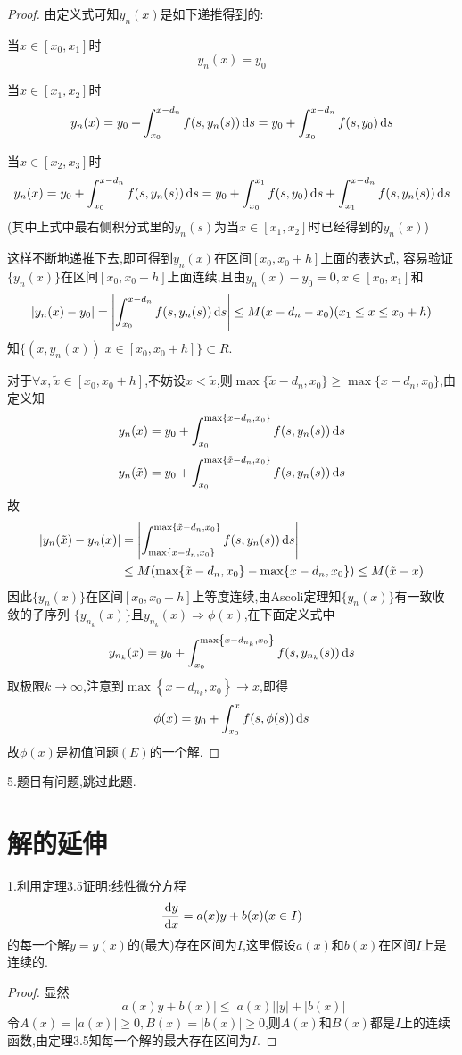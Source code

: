 \begin{proof}
由定义式可知$y_n(x)$是如下递推得到的:

当$x\in[x_0,x_1]$时
\[y_n(x)=y_0\]

当$x\in[x_1,x_2]$时
\[y_n(x)=y_0+\int_{x_0}^{x-d_n}f(s,y_n(s))\,\mathrm{d} s=y_0+\int_{x_0}^{x-d_n}f(s,y_0)\,\mathrm{d} s\]

当$x\in[x_2,x_3]$时
\[y_n(x)=y_0+\int_{x_0}^{x-d_n}f(s,y_n(s))\,\mathrm{d} s=y_0+\int_{x_0}^{x_1}f(s,y_0)\,\mathrm{d} s+\int_{x_1}^{x-d_n}f(s,y_n(s))\,\mathrm{d} s\]
(其中上式中最右侧积分式里的$y_n(s)$为当$x\in[x_1,x_2]$时已经得到的$y_n(x)$)

这样不断地递推下去,即可得到$y_n(x)$在区间$[x_0,x_0+h]$上面的表达式,
容易验证$\{y_n(x)\}$在区间$[x_0,x_0+h]$上面连续,且由$y_n(x)-y_0=0,x\in[x_0,x_1]$和
\[|y_n(x)-y_0|=\left|\int_{x_0}^{x-d_n}f(s,y_n(s))\,\mathrm{d} s\right|\leq M(x-d_n-x_0)(x_1\leq x\leq x_0+h)\]
知$\{(x,y_n(x))|x\in[x_0,x_0+h]\}\subset R$.

对于$\forall x,\tilde{x}\in[x_0,x_0+h]$,不妨设$x<\tilde{x}$,则$\max\{\tilde{x}-d_n,x_0\}\geq\max\{x-d_n,x_0\}$,由定义知
\[y_n(x)=y_0+\int_{x_0}^{\max\{x-d_n,x_0\}}f(s,y_n(s))\,\mathrm{d} s\]
\[y_n(\tilde{x})=y_0+\int_{x_0}^{\max\{\tilde{x}-d_n,x_0\}}f(s,y_n(s))\,\mathrm{d} s\]
故
\[\begin{split}|y_n(\tilde{x})-y_n(x)|&=\left|\int_{\max\{x-d_n,x_0\}}^{\max\{\tilde{x}-d_n,x_0\}}f(s,y_n(s))\,\mathrm{d} s\right|\\
&\leq M(\max\{\tilde{x}-d_n,x_0\}-\max\{x-d_n,x_0\})\leq M(\tilde{x}-x)
\end{split}\]
因此$\{y_n(x)\}$在区间$[x_0,x_0+h]$上等度连续,由Ascoli定理知$\{y_n(x)\}$有一致收敛的子序列
$\{y_{n_k}(x)\}$且$y_{n_k}(x)\Rightarrow\phi(x)$,在下面定义式中
\[y_{n_k}(x)=y_0+\int_{x_0}^{\max\left\{x-d_{n_k},x_0\right\}}f(s,y_{n_k}(s))\,\mathrm{d} s\]
取极限$k\to\infty$,注意到$\max\left\{x-d_{n_k},x_0\right\}\to x$,即得
\[\phi(x)=y_0+\int_{x_0}^xf(s,\phi(s))\,\mathrm{d} s\]
故$\phi(x)$是初值问题$(E)$的一个解.
\end{proof}


5.题目有问题,跳过此题.


\section{解的延伸}


1.利用定理3.5证明:线性微分方程
\[\frac{\,\mathrm{d} y}{\,\mathrm{d} x}=a(x)y+b(x)(x\in I)\]
的每一个解$y=y(x)$的(最大)存在区间为$I$,这里假设$a(x)$和$b(x)$在区间$I$上是连续的.

\begin{proof}显然
\[|a(x)y+b(x)|\leq|a(x)||y|+|b(x)|\]
令$A(x)=|a(x)|\geq0,B(x)=|b(x)|\geq0$,则$A(x)$和$B(x)$都是$I$上的连续函数,由定理3.5知每一个解的最大存在区间为$I$.
\end{proof}


